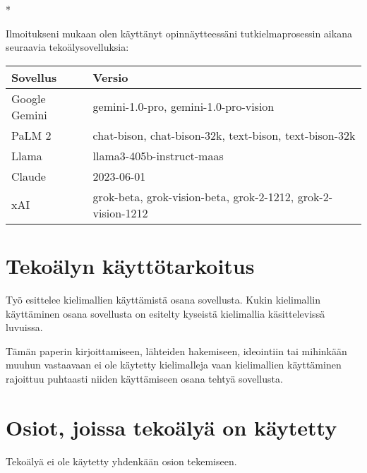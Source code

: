 \begin{aidisclaimer} * %

Ilmoitukseni mukaan olen käyttänyt opinnäytteessäni tutkielmaprosessin aikana
seuraavia tekoälysovelluksia:

\begin{center}
    \begin{tabularx}{\linewidth}{X|l}
        \toprule
        \textbf{Sovellus} & \textbf{Versio} \\
        \midrule
        Google Gemini & gemini-1.0-pro, gemini-1.0-pro-vision \\
        PaLM 2 & chat-bison, chat-bison-32k, text-bison, text-bison-32k \\
        Llama & llama3-405b-instruct-maas \\
        Claude & 2023-06-01 \\
        xAI & grok-beta, grok-vision-beta, grok-2-1212, grok-2-vision-1212 \\
        \bottomrule
    \end{tabularx}
\end{center}

\section*{Tekoälyn käyttötarkoitus}

Työ esittelee kielimallien käyttämistä osana sovellusta. Kukin kielimallin
käyttäminen osana sovellusta on esitelty kyseistä kielimallia käsittelevissä
luvuissa.

Tämän paperin kirjoittamiseen, lähteiden hakemiseen, ideointiin tai mihinkään
muuhun vastaavaan ei ole käytetty kielimalleja vaan kielimallien käyttäminen
rajoittuu puhtaasti niiden käyttämiseen osana tehtyä sovellusta.

\section*{Osiot, joissa tekoälyä on käytetty}

Tekoälyä ei ole käytetty yhdenkään osion tekemiseen.

\end{aidisclaimer}

